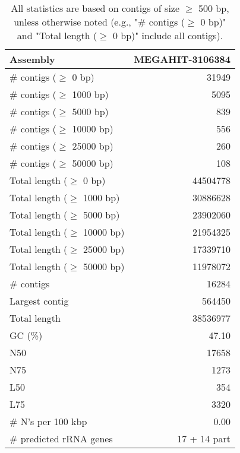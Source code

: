 \documentclass[12pt,a4paper]{article}
\begin{document}
\begin{table}[ht]
\begin{center}
\caption{All statistics are based on contigs of size $\geq$ 500 bp, unless otherwise noted (e.g., "\# contigs ($\geq$ 0 bp)" and "Total length ($\geq$ 0 bp)" include all contigs).}
\begin{tabular}{|l*{1}{|r}|}
\hline
Assembly & MEGAHIT-3106384 \\ \hline
\# contigs ($\geq$ 0 bp) & 31949 \\ \hline
\# contigs ($\geq$ 1000 bp) & 5095 \\ \hline
\# contigs ($\geq$ 5000 bp) & 839 \\ \hline
\# contigs ($\geq$ 10000 bp) & 556 \\ \hline
\# contigs ($\geq$ 25000 bp) & 260 \\ \hline
\# contigs ($\geq$ 50000 bp) & 108 \\ \hline
Total length ($\geq$ 0 bp) & 44504778 \\ \hline
Total length ($\geq$ 1000 bp) & 30886628 \\ \hline
Total length ($\geq$ 5000 bp) & 23902060 \\ \hline
Total length ($\geq$ 10000 bp) & 21954325 \\ \hline
Total length ($\geq$ 25000 bp) & 17339710 \\ \hline
Total length ($\geq$ 50000 bp) & 11978072 \\ \hline
\# contigs & 16284 \\ \hline
Largest contig & 564450 \\ \hline
Total length & 38536977 \\ \hline
GC (\%) & 47.10 \\ \hline
N50 & 17658 \\ \hline
N75 & 1273 \\ \hline
L50 & 354 \\ \hline
L75 & 3320 \\ \hline
\# N's per 100 kbp & 0.00 \\ \hline
\# predicted rRNA genes & 17 + 14 part \\ \hline
\end{tabular}
\end{center}
\end{table}
\end{document}
